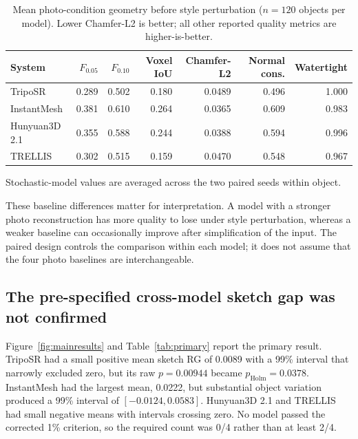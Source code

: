 \documentclass[12pt,a4paper]{article}
\begin{document}
\begin{table}[!ht]
\caption{\label{tab:photo}Mean photo-condition geometry before style perturbation ($n=120$ objects per model). Lower Chamfer-L2 is better; all other reported quality metrics are higher-is-better.}
\centering
\begin{threeparttable}
\begin{tabular}{lrrrrrr}
\toprule
System & $F_{0.05}$ & $F_{0.10}$ & Voxel IoU & Chamfer-L2 & Normal cons. & Watertight \\
\midrule
TripoSR & 0.289 & 0.502 & 0.180 & 0.0489 & 0.496 & 1.000 \\
InstantMesh & 0.381 & 0.610 & 0.264 & 0.0365 & 0.609 & 0.983 \\
Hunyuan3D 2.1 & 0.355 & 0.588 & 0.244 & 0.0388 & 0.594 & 0.996 \\
TRELLIS & 0.302 & 0.515 & 0.159 & 0.0470 & 0.548 & 0.967 \\
\bottomrule
\end{tabular}
\begin{tablenotes}\footnotesize
\item Stochastic-model values are averaged across the two paired seeds within object.
\end{tablenotes}
\end{threeparttable}
\end{table}

These baseline differences matter for interpretation. A model with a stronger photo reconstruction has more quality to lose under style perturbation, whereas a weaker baseline can occasionally improve after simplification of the input. The paired design controls the comparison within each model; it does not assume that the four photo baselines are interchangeable.

\subsection{The pre-specified cross-model sketch gap was not confirmed}

Figure~\ref{fig:mainresults} and Table~\ref{tab:primary} report the primary result. TripoSR had a small positive mean sketch RG of 0.0089 with a 99\% interval that narrowly excluded zero, but its raw $p=0.00944$ became $p_{\mathrm{Holm}}=0.0378$. InstantMesh had the largest mean, 0.0222, but substantial object variation produced a 99\% interval of $[-0.0124,0.0583]$. Hunyuan3D 2.1 and TRELLIS had small negative means with intervals crossing zero. No model passed the corrected 1\% criterion, so the required count was 0/4 rather than at least 2/4.
\end{document}
